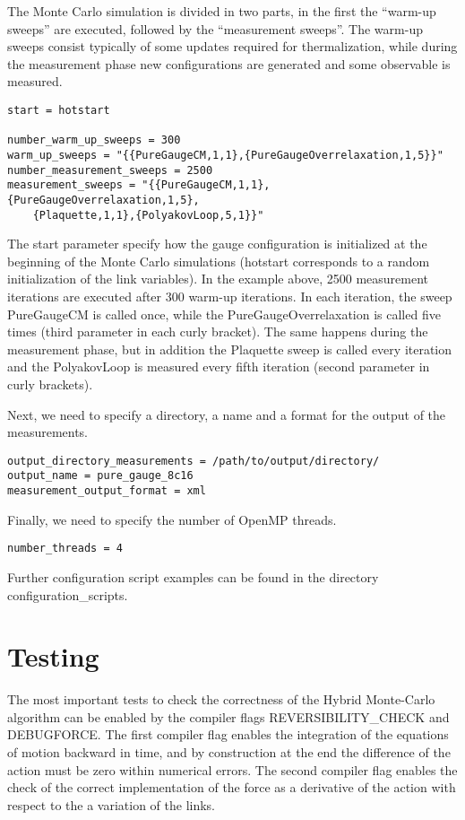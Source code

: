 \documentclass[11pt,a4paper]{article}
\begin{document}
The Monte Carlo simulation is divided in two parts, in the first the ``warm-up sweeps'' are executed, followed by the ``measurement sweeps''. The warm-up sweeps consist typically of some updates required for thermalization, while during the measurement phase new configurations are generated and some observable is measured.
\begin{lstlisting}
start = hotstart

number_warm_up_sweeps = 300
warm_up_sweeps = "{{PureGaugeCM,1,1},{PureGaugeOverrelaxation,1,5}}"
number_measurement_sweeps = 2500
measurement_sweeps = "{{PureGaugeCM,1,1},{PureGaugeOverrelaxation,1,5},
	{Plaquette,1,1},{PolyakovLoop,5,1}}"
\end{lstlisting}
The start parameter specify how the gauge configuration is initialized at the beginning of the Monte Carlo simulations (hotstart corresponds to a random initialization of the link variables). In the example above, 2500 measurement iterations are executed after 300 warm-up iterations. In each iteration, the sweep PureGaugeCM is called once, while the PureGaugeOverrelaxation is called five times (third parameter in each curly bracket). The same happens during the measurement phase, but in addition the Plaquette sweep is called every iteration and the PolyakovLoop is measured every fifth iteration (second parameter in curly brackets).

Next, we need to specify a directory, a name and a format for the output of the measurements.
\begin{lstlisting}
output_directory_measurements = /path/to/output/directory/
output_name = pure_gauge_8c16
measurement_output_format = xml
\end{lstlisting}
Finally, we need to specify the number of OpenMP threads.
\begin{lstlisting}
number_threads = 4
\end{lstlisting}

Further configuration script examples can be found in the directory configuration\_scripts.

\section{Testing}

The most important tests to check the correctness of the Hybrid Monte-Carlo algorithm can be enabled by the compiler flags REVERSIBILITY\_CHECK and DEBUGFORCE. The first compiler flag enables the integration of the equations of motion backward in time, and by construction at the end the difference of the action must be zero within numerical errors. The second compiler flag enables the check of the correct implementation of the force as a derivative of the action with respect to the a variation of the links.
\end{document}
